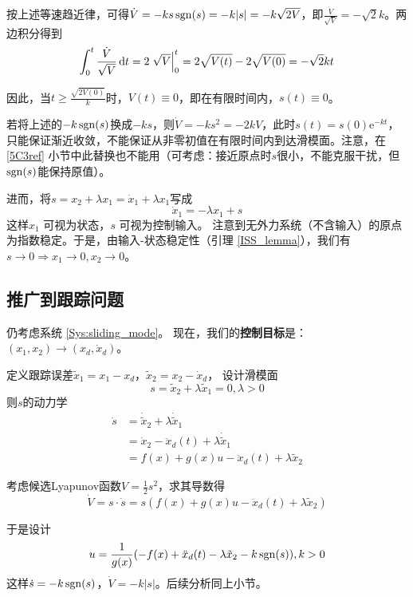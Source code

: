  按上述等速趋近律，可得$\dot{V} = - ks \operatorname{sgn} (s) = - k | s | =
  - k \sqrt{2 V}$，即$\frac{\dot{V}}{\sqrt{V}} = - \sqrt{2} k $。两边积分得到
  \[ \int^t_0 \frac{\dot{V}}{\sqrt{V}} \mathop{}\!\mathrm{d} t = 2 \left. \sqrt{V} \right|^t_0 = 2
   \sqrt{V (t)} - 2 \sqrt{V (0)}  = - \sqrt{2} k  t \]
  
  因此，当$t \geq \frac{\sqrt{2 V (0)}}{k}$时，$V (t) \equiv 0$，即在有限时间内，$s (t) \equiv 0$。

  \begin{note}
    若将上述的$-k\operatorname{sgn}(s)$换成$-ks$，则$\dot{V} = - ks^2=  - 2k V$，此时$s(t)=s(0)\mathrm{e}^{-kt}$，只能保证渐近收敛，不能保证从非零初值在有限时间内到达滑模面。注意，在 \ref{5C3ref} 小节中此替换也不能用（可考虑：接近原点时$s$很小，不能克服干扰，但$\operatorname{sgn}(s)$能保持原值）。
  \end{note}

  进而，将$s = x_2 + \lambda x_1 = \dot{x}_1 + \lambda x_1$写成
  \[ \dot{x}_1 = - \lambda x_1 + s \]
  这样$x_1$ 可视为状态，$s$ 可视为控制输入。
  注意到无外力系统（不含输入）的原点为指数稳定。于是，由输入-状态稳定性（引理 \ref{ISS_lemma}），我们有$s \rightarrow 0 \Rightarrow x_1 \rightarrow 0, x_2 \rightarrow 0$。

\subsection{推广到跟踪问题}

仍考虑系统 \eqref{Sys:sliding_mode}。
现在，我们的{\bf 控制目标}是：$(x_1, x_2) \rightarrow (x_d, \dot{x}_d)$。

定义跟踪误差$\tilde{x}_1 = x_1 - x_d$，$\tilde{x}_2 = x_2 - \dot{x}_d$，
设计滑模面\[s = \tilde{x}_2 + \lambda \tilde{x}_1 = 0,\lambda>0\]
则$s$的动力学
\begin{align*}
\dot{s} &= \dot{\tilde{x}}_2 + \lambda \dot{\tilde{x}}_1 \\
&= \dot{x}_2 -\ddot{x}_d (t) + \lambda \dot{\tilde{x}}_1 \\
&= f (x) + g (x) u - \ddot{x}_d (t) +\lambda \tilde{x}_2
\end{align*}

考虑候选Lyapunov函数$V = \frac{1}{2} s^2$，求其导数得
\[\dot{V} = s \cdot \dot{s} = s (f (x) + g (x) u -
\ddot{x}_d (t) + \lambda \tilde{x}_2)\]

于是设计\begin{equation}
    u = \frac{1}{g (x)} (- f (x) + \ddot{x}_d (t) - \lambda \tilde{x}_2 - k
\operatorname{sgn} (s)),k>0\label{tracking_control}
\end{equation}这样$\dot{s} = - k \operatorname{sgn} (s)$，$\dot{V}=-k|s|$。后续分析同上小节。

